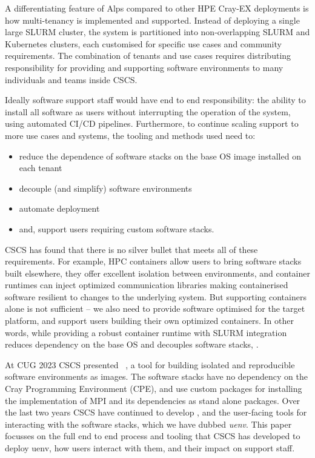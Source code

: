 A differentiating feature of Alps compared to other HPE Cray-EX deployments is how multi-tenancy is implemented and supported.
Instead of deploying a single large SLURM cluster, the system is partitioned into non-overlapping SLURM and Kubernetes clusters, each customised for specific use cases and community requirements.
The combination of tenants and use cases requires distributing responsibility for providing and supporting software environments to many individuals and teams inside CSCS.

Ideally software support staff would have end to end responsibility: the ability to install all software as users without interrupting the operation of the system, using automated CI/CD pipelines.
Furthermore, to continue scaling support to more use cases and systems, the tooling and methods used need to:
\begin{itemize}
    \item reduce the dependence of software stacks on the base OS image installed on each tenant
    \item decouple (and simplify) software environments
    \item automate deployment
    \item and, support users requiring custom software stacks.
\end{itemize}

CSCS has found that there is no silver bullet that meets all of these requirements.
For example, HPC containers allow users to bring software stacks built elsewhere, they offer excellent isolation between environments, and container runtimes can inject optimized communication libraries making containerised software resilient to changes to the underlying system.
But supporting containers alone is not sufficient -- we also need to provide software optimised for the target platform, and support users building their own optimized containers.
In other words, while providing a robust container runtime with SLURM integration reduces dependency on the base OS and decouples software stacks, .

At CUG 2023 CSCS presented \stackinator~\cite{uenv2023}, a tool for building isolated and reproducible software environments as \squashfs images.
The software stacks have no dependency on the Cray Programming Environment (CPE), and use custom \spack packages for installing the \craympich implementation of MPI and its dependencies as stand alone packages.
Over the last two years CSCS have continued to develop \stackinator, and the user-facing tools for interacting with the software stacks, which we have dubbed \emph{uenv}.
This paper focusses on the full end to end process and tooling that CSCS has developed to deploy uenv, how users interact with them, and their impact on support staff.

